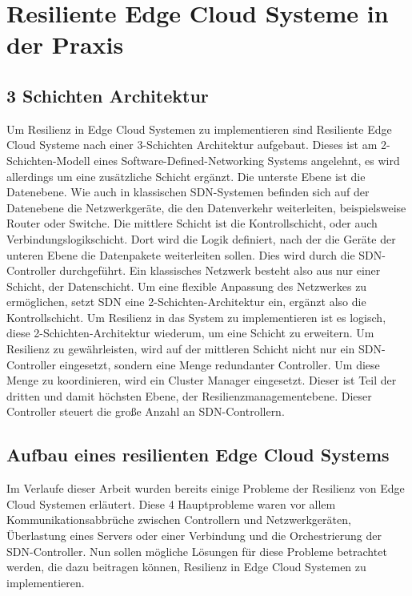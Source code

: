 \newpage
\section{Resiliente Edge Cloud Systeme in der Praxis} \label{latexDetails}

\subsection{3 Schichten Architektur}

Um Resilienz in Edge Cloud Systemen zu implementieren sind Resiliente Edge Cloud Systeme nach einer 3-Schichten Architektur aufgebaut. Dieses ist am 2-Schichten-Modell eines Software-Defined-Networking Systems angelehnt, 
es wird allerdings um eine zusätzliche Schicht ergänzt. Die unterste Ebene ist die Datenebene. Wie auch in klassischen SDN-Systemen befinden sich auf der Datenebene die Netzwerkgeräte, die den Datenverkehr weiterleiten, 
beispielsweise Router oder Switche. Die mittlere Schicht ist die Kontrollschicht, oder auch Verbindungslogikschicht. Dort wird die Logik definiert, nach der die Geräte der unteren Ebene die Datenpakete weiterleiten sollen. 
Dies wird durch die SDN-Controller durchgeführt. Ein klassisches Netzwerk besteht also aus nur einer Schicht, der Datenschicht. Um eine flexible Anpassung des Netzwerkes zu ermöglichen, 
setzt SDN eine 2-Schichten-Architektur ein, ergänzt also die Kontrollschicht. Um Resilienz in das System zu implementieren ist es logisch, diese 2-Schichten-Architektur wiederum, um eine Schicht zu erweitern. 
Um Resilienz zu gewährleisten, wird auf der mittleren Schicht nicht nur ein SDN-Controller eingesetzt, sondern eine Menge redundanter Controller. Um diese Menge zu koordinieren, wird ein Cluster Manager eingesetzt. 
Dieser ist Teil der dritten und damit höchsten Ebene, der Resilienzmanagementebene. Dieser Controller steuert die große Anzahl an SDN-Controllern.



\subsection{Aufbau eines resilienten Edge Cloud Systems}


Im Verlaufe dieser Arbeit wurden bereits einige Probleme der Resilienz von Edge Cloud Systemen erläutert. Diese 4 Hauptprobleme waren vor allem Kommunikationsabbrüche zwischen Controllern und Netzwerkgeräten, 
Überlastung eines Servers oder einer Verbindung und die Orchestrierung der SDN-Controller. Nun sollen mögliche Lösungen für diese Probleme betrachtet werden, die dazu beitragen können, 
Resilienz in Edge Cloud Systemen zu implementieren. 

